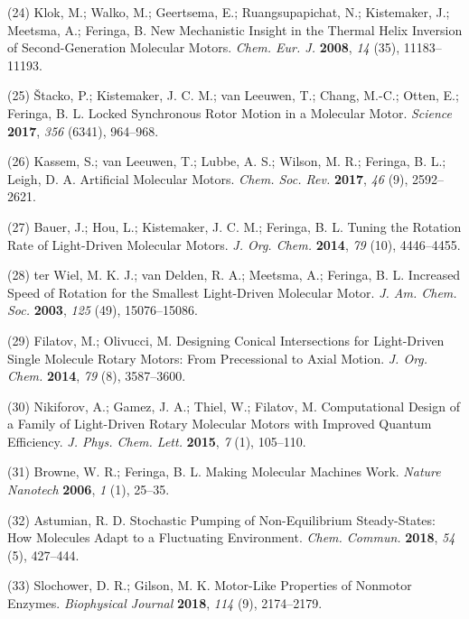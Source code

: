 \documentclass[11pt,notitlepage]{article}
\begin{document}
\leavevmode\hypertarget{ref-FwAqK1Dt}{}%
(24) Klok, M.; Walko, M.; Geertsema, E.; Ruangsupapichat, N.;
Kistemaker, J.; Meetsma, A.; Feringa, B. New Mechanistic Insight in the
Thermal Helix Inversion of Second-Generation Molecular Motors.
\emph{Chem. Eur. J.} \textbf{2008}, \emph{14} (35), 11183--11193.

\leavevmode\hypertarget{ref-mKSNFvW7}{}%
(25) Štacko, P.; Kistemaker, J. C. M.; van Leeuwen, T.; Chang, M.-C.;
Otten, E.; Feringa, B. L. Locked Synchronous Rotor Motion in a Molecular
Motor. \emph{Science} \textbf{2017}, \emph{356} (6341), 964--968.

\leavevmode\hypertarget{ref-1H5r7SBir}{}%
(26) Kassem, S.; van Leeuwen, T.; Lubbe, A. S.; Wilson, M. R.; Feringa,
B. L.; Leigh, D. A. Artificial Molecular Motors. \emph{Chem. Soc. Rev.}
\textbf{2017}, \emph{46} (9), 2592--2621.

\leavevmode\hypertarget{ref-MVPWALSk}{}%
(27) Bauer, J.; Hou, L.; Kistemaker, J. C. M.; Feringa, B. L. Tuning the
Rotation Rate of Light-Driven Molecular Motors. \emph{J. Org. Chem.}
\textbf{2014}, \emph{79} (10), 4446--4455.

\leavevmode\hypertarget{ref-1F5wsgY82}{}%
(28) ter Wiel, M. K. J.; van Delden, R. A.; Meetsma, A.; Feringa, B. L.
Increased Speed of Rotation for the Smallest Light-Driven Molecular
Motor. \emph{J. Am. Chem. Soc.} \textbf{2003}, \emph{125} (49),
15076--15086.

\leavevmode\hypertarget{ref-Ewc7FKL8}{}%
(29) Filatov, M.; Olivucci, M. Designing Conical Intersections for
Light-Driven Single Molecule Rotary Motors: From Precessional to Axial
Motion. \emph{J. Org. Chem.} \textbf{2014}, \emph{79} (8), 3587--3600.

\leavevmode\hypertarget{ref-122TltEto}{}%
(30) Nikiforov, A.; Gamez, J. A.; Thiel, W.; Filatov, M. Computational
Design of a Family of Light-Driven Rotary Molecular Motors with Improved
Quantum Efficiency. \emph{J. Phys. Chem. Lett.} \textbf{2015}, \emph{7}
(1), 105--110.

\leavevmode\hypertarget{ref-10FsKpWBI}{}%
(31) Browne, W. R.; Feringa, B. L. Making Molecular Machines Work.
\emph{Nature Nanotech} \textbf{2006}, \emph{1} (1), 25--35.

\leavevmode\hypertarget{ref-qhUBHBOM}{}%
(32) Astumian, R. D. Stochastic Pumping of Non-Equilibrium
Steady-States: How Molecules Adapt to a Fluctuating Environment.
\emph{Chem. Commun.} \textbf{2018}, \emph{54} (5), 427--444.

\leavevmode\hypertarget{ref-1BfYw0gk2}{}%
(33) Slochower, D. R.; Gilson, M. K. Motor-Like Properties of Nonmotor
Enzymes. \emph{Biophysical Journal} \textbf{2018}, \emph{114} (9),
2174--2179.
\end{document}
